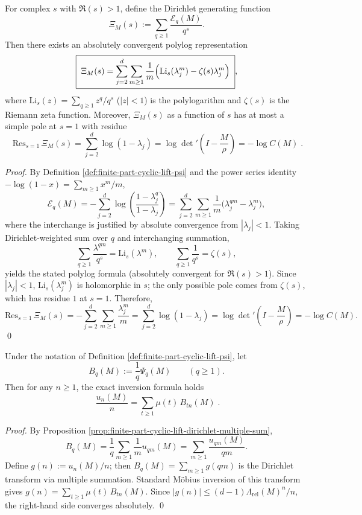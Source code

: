 \begin{theorem}\label{thm:finite-part-cyclic-lift-polylog-dirichlet-xi}
For complex \(s\) with \(\Re(s)>1\), define the Dirichlet generating function
\[
\Xi_M(s):=\sum_{q\ge 1}\frac{\mathcal{E}_q(M)}{q^s}.
\]
Then there exists an absolutely convergent polylog representation
\[
\boxed{\;
\Xi_M(s)=\sum_{j=2}^{d}\sum_{m\ge 1}\frac{1}{m}\Bigl(\mathrm{Li}_s(\lambda_j^{m})-\zeta(s)\lambda_j^{m}\Bigr)\; },
\]
where \(\mathrm{Li}_s(z)=\sum_{q\ge 1}z^{q}/q^{s}\) (\(|z|<1\)) is the polylogarithm and \(\zeta(s)\) is the Riemann zeta function.
Moreover, \(\Xi_M(s)\) as a function of \(s\) has at most a simple pole at \(s=1\) with residue
\[
\boxed{\;
\mathrm{Res}_{s=1}\,\Xi_M(s)
=\sum_{j=2}^{d}\log(1-\lambda_j)
=\log\det\nolimits'\!\left(I-\frac{M}{\rho}\right)
=-\log C(M)\; }.
\]
\end{theorem}
\begin{proof}
By Definition \ref{def:finite-part-cyclic-lift-psi} and the power series identity \(-\log(1-x)=\sum_{m\ge 1}x^m/m\),
\[
\mathcal{E}_q(M)=-\sum_{j=2}^{d}\log\!\left(\frac{1-\lambda_j^{q}}{1-\lambda_j}\right)
=\sum_{j=2}^{d}\sum_{m\ge 1}\frac{1}{m}\bigl(\lambda_j^{qm}-\lambda_j^{m}\bigr),
\]
where the interchange is justified by absolute convergence from \(|\lambda_j|<1\).
Taking Dirichlet-weighted sum over \(q\) and interchanging summation,
\[
\sum_{q\ge 1}\frac{\lambda^{qm}}{q^s}=\mathrm{Li}_s(\lambda^m),
\qquad
\sum_{q\ge 1}\frac{1}{q^s}=\zeta(s),
\]
yields the stated polylog formula (absolutely convergent for \(\Re(s)>1\)).
Since \(|\lambda_j|<1\), \(\mathrm{Li}_s(\lambda_j^m)\) is holomorphic in \(s\); the only possible pole comes from \(\zeta(s)\), which has residue \(1\) at \(s=1\).
Therefore,
\[
\mathrm{Res}_{s=1}\,\Xi_M(s)
=-\sum_{j=2}^{d}\sum_{m\ge 1}\frac{\lambda_j^{m}}{m}
=\sum_{j=2}^{d}\log(1-\lambda_j)
=\log\det\nolimits'\!\left(I-\frac{M}{\rho}\right)
=-\log C(M).
\]
\qed
\end{proof}

\begin{proposition}\label{prop:finite-part-cyclic-lift-mobius-inversion}
Under the notation of Definition \ref{def:finite-part-cyclic-lift-psi}, let
\[
B_q(M):=\frac{1}{q}\Psi_q(M)\qquad(q\ge 1).
\]
Then for any \(n\ge 1\), the exact inversion formula holds
\[
\boxed{\;
\frac{u_n(M)}{n}=\sum_{t\ge 1}\mu(t)\,B_{tn}(M)\; }.
\]
\end{proposition}
\begin{proof}
By Proposition \ref{prop:finite-part-cyclic-lift-dirichlet-multiple-sum},
\[
B_q(M)=\frac{1}{q}\sum_{m\ge 1}\frac{1}{m}u_{qm}(M)=\sum_{m\ge 1}\frac{u_{qm}(M)}{qm}.
\]
Define \(g(n):=u_n(M)/n\); then \(B_q(M)=\sum_{m\ge 1}g(qm)\) is the Dirichlet transform via multiple summation.
Standard Möbius inversion of this transform gives
\(
g(n)=\sum_{t\ge 1}\mu(t)\,B_{tn}(M)
\).
Since \(|g(n)|\le (d-1)\Lambda_{\mathrm{rel}}(M)^n/n\), the right-hand side converges absolutely. \qed
\end{proof}

